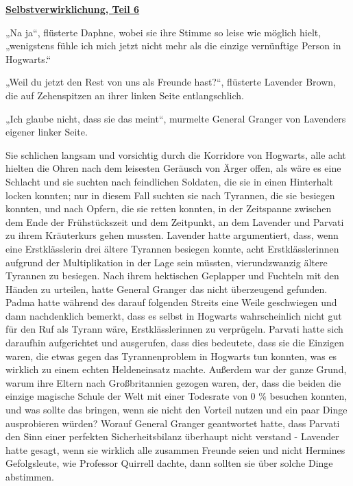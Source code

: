 

\hypertarget{selbstverwirklichung-teil-6}{%

\textbf{\uline{Selbstverwirklichung, Teil 6}}

\hfill\break „Na ja“, flüsterte Daphne, wobei sie ihre Stimme so leise wie möglich hielt, „wenigstens fühle ich mich jetzt nicht mehr als die einzige vernünftige Person in Hogwarts.“

„Weil du jetzt den Rest von uns als Freunde hast?“, flüsterte Lavender Brown, die auf Zehenspitzen an ihrer linken Seite entlangschlich.

„Ich glaube nicht, dass sie das meint“, murmelte General Granger von Lavenders eigener linker Seite.

Sie schlichen langsam und vorsichtig durch die Korridore von Hogwarts, alle acht hielten die Ohren nach dem leisesten Geräusch von Ärger offen, als wäre es eine Schlacht und sie suchten nach feindlichen Soldaten, die sie in einen Hinterhalt locken konnten; nur in diesem Fall suchten sie nach Tyrannen, die sie besiegen konnten, und nach Opfern, die sie retten konnten, in der Zeitspanne zwischen dem Ende der Frühstückszeit und dem Zeitpunkt, an dem Lavender und Parvati zu ihrem Kräuterkurs gehen mussten. Lavender hatte argumentiert, dass, wenn eine Erstklässlerin drei ältere Tyrannen besiegen konnte, acht Erstklässlerinnen aufgrund der Multiplikation in der Lage sein müssten, vierundzwanzig ältere Tyrannen zu besiegen. Nach ihrem hektischen Geplapper und Fuchteln mit den Händen zu urteilen, hatte General Granger das nicht überzeugend gefunden. Padma hatte während des darauf folgenden Streits eine Weile geschwiegen und dann nachdenklich bemerkt, dass es selbst in Hogwarts wahrscheinlich nicht gut für den Ruf als Tyrann wäre, Erstklässlerinnen zu verprügeln. Parvati hatte sich daraufhin aufgerichtet und ausgerufen, dass dies bedeutete, dass sie die Einzigen waren, die etwas gegen das Tyrannenproblem in Hogwarts tun konnten, was es wirklich zu einem echten Heldeneinsatz machte. Außerdem war der ganze Grund, warum ihre Eltern nach Großbritannien gezogen waren, der, dass die beiden die einzige magische Schule der Welt mit einer Todesrate von 0 \% besuchen konnten, und was sollte das bringen, wenn sie nicht den Vorteil nutzen und ein paar Dinge ausprobieren würden? Worauf General Granger geantwortet hatte, dass Parvati den Sinn einer perfekten Sicherheitsbilanz überhaupt nicht verstand - Lavender hatte gesagt, wenn sie wirklich alle zusammen Freunde seien und nicht Hermines Gefolgsleute, wie Professor Quirrell dachte, dann sollten sie über solche Dinge abstimmen.

}
